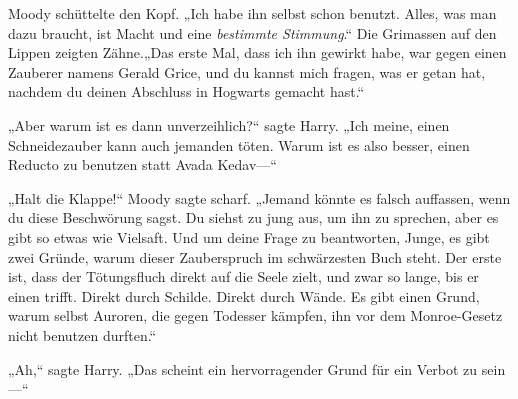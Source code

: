Moody schüttelte den Kopf. „Ich habe ihn selbst schon benutzt. Alles, was man dazu braucht, ist Macht und eine \emph{bestimmte Stimmung}.“ Die Grimassen auf den Lippen zeigten Zähne.„Das erste Mal, dass ich ihn gewirkt habe, war gegen einen Zauberer namens Gerald Grice, und du kannst mich fragen, was er getan hat, nachdem du deinen Abschluss in Hogwarts gemacht hast.“

„Aber warum ist es dann unverzeihlich?“ sagte Harry. „Ich meine, einen Schneidezauber kann auch jemanden töten. Warum ist es also besser, einen Reducto zu benutzen statt Avada Kedav—“

„Halt die Klappe!“ Moody sagte scharf. „Jemand könnte es falsch auffassen, wenn du diese Beschwörung sagst. Du siehst zu jung aus, um ihn zu sprechen, aber es gibt so etwas wie Vielsaft. Und um deine Frage zu beantworten, Junge, es gibt zwei Gründe, warum dieser Zauberspruch im schwärzesten Buch steht. Der erste ist, dass der Tötungsfluch direkt auf die Seele zielt, und zwar so lange, bis er einen trifft. Direkt durch Schilde. Direkt durch Wände. Es gibt einen Grund, warum selbst Auroren, die gegen Todesser kämpfen, ihn vor dem Monroe-Gesetz nicht benutzen durften.“

„Ah,“ sagte Harry. „Das scheint ein hervorragender Grund für ein Verbot zu sein—“

